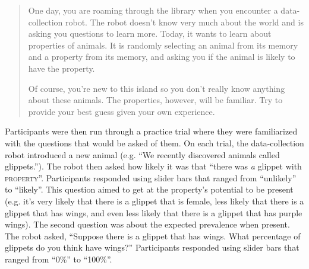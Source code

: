 \documentclass[10pt,letterpaper]{article}
\begin{document}
\begin{quote}
One day, you are roaming through the library when you encounter a data-collection robot. The robot doesn't know very much about the world and is asking you questions to learn more. Today, it wants to learn about properties of animals. It is randomly selecting an animal from its memory and a property from its memory, and asking you if the animal is likely to have the property.

Of course, you're new to this island so you don't really know anything about these animals. The properties, however, will be familiar. Try to provide your best guess given your own experience.
\end{quote}

Participants were then run through a practice trial where they were familiarized with the questions that would be asked of them. 
On each trial, the data-collection robot introduced a new animal (e.g. ``We recently discovered animals called glippets.''). 
The robot then asked how likely it was that ``there was \emph{a} glippet with \textsc{property}''. 
Participants responded using slider bars that ranged from ``unlikely'' to ``likely''.
This question aimed to get at the property's potential to be present
(e.g. it's very likely that there is a glippet that is female, less likely that there is a glippet that has wings, and even less likely that there is a glippet that has purple wings). 
The second question was about the expected prevalence when present. 
The robot asked, ``Suppose there is a glippet that has wings. What percentage of glippets do you think have wings?'' 
Participants responded using slider bars that ranged from ``0\%'' to ``100\%''.

\end{document}
